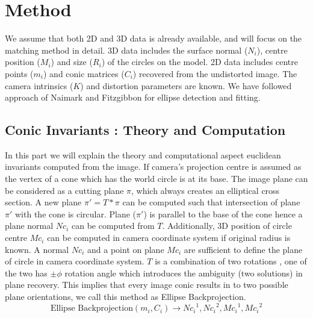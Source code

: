 \documentclass{bmvc2k}
\def\etal{\emph{et al}\bmvaOneDot}
\begin{document}
\section{Method}
We assume that both 2D and 3D data is already available, and will focus on the matching method in detail. 
3D data includes the surface normal ($N_i$), centre position ($M_i$) and size ($R_i$) of the circles on the model. 
2D data includes centre points ($m_i$) and conic matrices ($C_i$) recovered from the undistorted image. The camera intrinsics ($K$) and distortion parameters are known. We have followed approach of Naimark \cite{naimark_circular_2002} and Fitzgibbon \cite{fitzgibbon_direct_1999} for ellipse detection and fitting.  

\subsection{Conic Invariants : Theory and Computation}
\label{subSec:ConicInv}
In this part we will explain the theory and computational aspect euclidean invariants computed from the image.  
If camera's projection centre is assumed as the vertex of a cone which has the world circle is at its base.
The image plane can be considered as a cutting plane $\pi$, which always creates an elliptical cross section.  
A new plane $ \pi' = T* \pi $ can be computed such that intersection of plane $\pi'$ with the cone is circular. 
Plane ($\pi'$) is parallel to the base of the cone hence a plane normal $Nc_i$ can be computed from $T$. 
Additionally, 3D position of circle centre $Mc_i$ can be computed in camera coordinate system if original radius is known.
A normal $Nc_i$ and a point on plane $Mc_i$ are sufficient to define the plane of circle in camera coordinate system.
$ T $ is a combination of two rotations \cite{forsyth_91}\cite{lo_pez_de_ipin_a_trip:_2002}, one of the two has $\pm \phi$ rotation angle which introduces the ambiguity (two solutions) in plane recovery. 
This implies that every image conic results in to two possible plane orientations, we call this method as Ellipse Backprojection. 
\begin{equation}
\text{Ellipse Backprojection}(m_i,C_i) \rightarrow {Nc_i}^1,{Nc_i}^2,{Mc_i}^1,{Mc_i}^2
\end{equation}
\end{document}
